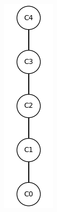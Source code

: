 \documentclass[runningheads,a4paper]{llncs}
\begin{document}
\begin{example}
\begin{figure}
\begin{minipage}{\textwidth}
\begin{minipage}{0.1\textwidth}
			\includegraphics[height = 2\textwidth]{im/ex-ma2-other-contexts-4.png}
		\end{minipage}
		\begin{minipage}{0.2\textwidth}
			\centering

\end{minipage}
\end{minipage}
\end{figure}
\end{example}
\end{document}

